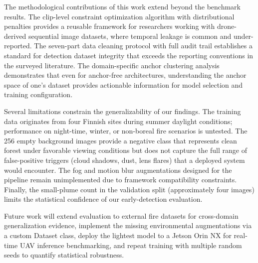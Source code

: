 \documentclass[10pt,twocolumn]{article}
\begin{document}
The methodological contributions of this work extend beyond the benchmark results. The clip-level constraint optimization algorithm with distributional penalties provides a reusable framework for researchers working with drone-derived sequential image datasets, where temporal leakage is common and under-reported. The seven-part data cleaning protocol with full audit trail establishes a standard for detection dataset integrity that exceeds the reporting conventions in the surveyed literature. The domain-specific anchor clustering analysis demonstrates that even for anchor-free architectures, understanding the anchor space of one's dataset provides actionable information for model selection and training configuration.

Several limitations constrain the generalizability of our findings. The training data originates from four Finnish sites during summer daylight conditions; performance on night-time, winter, or non-boreal fire scenarios is untested. The 256 empty background images provide a negative class that represents clean forest under favorable viewing conditions but does not capture the full range of false-positive triggers (cloud shadows, dust, lens flares) that a deployed system would encounter. The fog and motion blur augmentations designed for the pipeline remain unimplemented due to framework compatibility constraints. Finally, the small-plume count in the validation split (approximately four images) limits the statistical confidence of our early-detection evaluation.

Future work will extend evaluation to external fire datasets for cross-domain generalization evidence, implement the missing environmental augmentations via a custom Dataset class, deploy the lightest model to a Jetson Orin NX for real-time UAV inference benchmarking, and repeat training with multiple random seeds to quantify statistical robustness.
\end{document}

